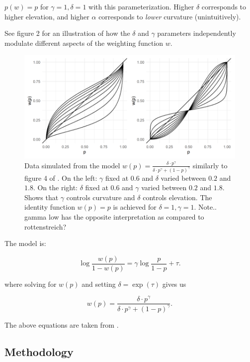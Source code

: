 \documentclass[12pt]{article}
\begin{document}
$p(w) = p$ for  $\gamma = 1, \delta = 1$
with this parameterization. Higher  $\delta$
corresponds to higher elevation, and
higher $\alpha $ corresponds to \emph{lower}
curvature (unintuitively).

See figure 2 for an illustration of how the $\delta$
and $\gamma$ parameters independently modulate
different aspects of the weighting function $w$.

\begin{figure}[h!]
	\includegraphics[width = \linewidth]{../Figures/Fig2.png}
	\caption{Data simulated from the model
		$w(p) = \frac{\delta \cdot p^{\gamma}}
	{\delta \cdot p^{\gamma} +
	(1-p)^{\gamma}}$ similarly to figure 4
	of \textcite{gonzalez1999shape}.
	On the left: $\gamma$ fixed at $0.6$
	and $\delta$ varied between $0.2$ and $1.8$.
	On the right: $\delta$ fixed at $0.6$
	and $\gamma$ varied between $0.2$ and $1.8$.
	Shows that $\gamma$  controls
	curvature and $\delta$ controls
	elevation. The identity function $w(p) = p$
	is achieved for $\delta = 1, \gamma = 1$.
	Note.. gamma low has the opposite interpretation
	as compared to rottenstreich?}
\end{figure}



\vspace{3mm}

The model is:

\[
	\log\frac{w(p)}{1-w(p)} =
	\gamma \log\frac{p}{1-p} + \tau
.\]

where solving for $w(p)$ and setting $\delta = \exp(\tau)$
gives us

\[
	w(p) = \frac{\delta \cdot p^{\gamma}}
	{\delta \cdot p^{\gamma} +
	(1-p)^{\gamma}}
.\]

The above equations are taken from \textcite{
rottenstreich2001money}.

\subsection{Methodology}
\end{document}
